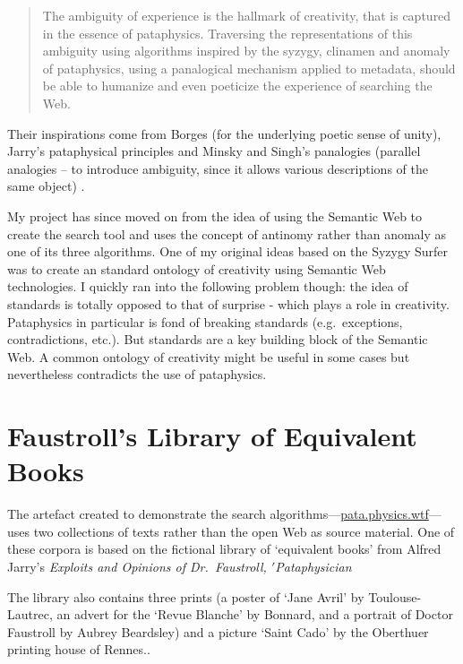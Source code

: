\begin{quotation}
  The ambiguity of experience is the hallmark of creativity, that is captured in the essence of pataphysics. Traversing the representations of this ambiguity using algorithms inspired by the syzygy, clinamen and anomaly of pataphysics, using a panalogical mechanism applied to metadata, should be able to humanize and even poeticize the experience of searching the Web. 
\end{quotation}

Their inspirations come from Borges \autocite*{Borges2000} (for the underlying poetic sense of unity), Jarry's pataphysical principles \autocite*{Jarry1996} and Minsky and Singh's panalogies (parallel analogies – to introduce ambiguity, since it allows various descriptions of the same object) \autocite*{Singh2005}.

My project has since moved on from the idea of using the Semantic Web to create the search tool and uses the concept of antinomy rather than anomaly as one of its three algorithms. One of my original ideas based on the Syzygy Surfer was to create an standard ontology of creativity using Semantic Web technologies. I quickly ran into the following problem though: the idea of standards is totally opposed to that of surprise - which plays a role in creativity. Pataphysics in particular is fond of breaking standards (e.g.\ exceptions, contradictions, etc.). But standards are a key building block of the Semantic Web. A common ontology of creativity might be useful in some cases but nevertheless contradicts the use of pataphysics.


\section{Faustroll's Library of Equivalent Books}
\label{s:faustlib}

The artefact created to demonstrate the search algorithms---\url{pata.physics.wtf}---uses two collections of texts rather than the open Web as source material. One of these corpora is based on the fictional library of `equivalent books' from Alfred Jarry's \textit{Exploits and Opinions of Dr.\ Faustroll, $'$Pataphysician} \citeyear[p.10-12]{Jarry1996}

The library also contains three prints (a poster of `Jane Avril' by Toulouse-Lautrec, an advert for the `Revue Blanche' by Bonnard, and a portrait of Doctor Faustroll by Aubrey Beardsley) and a picture `Saint Cado' by the Oberthuer printing house of Rennes.\autocite[p.12]{Jarry1996}.

